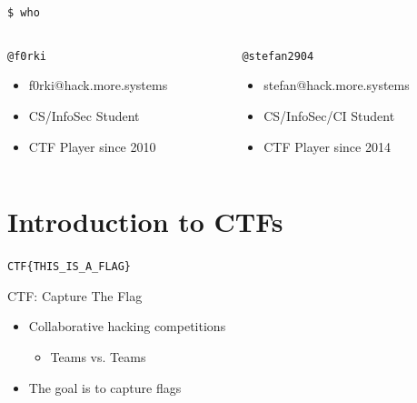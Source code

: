{
\begin{frame}[t,plain]
    \titlepage
\end{frame}
}

\begin{frame}
  {\texttt{\$ who}}

  \begin{columns}
    \begin{column}{0.48\textwidth}
      {\texttt{@f0rki}}
      \begin{itemize}
        \item f0rki@hack.more.systems
        \item CS/InfoSec Student
        \item CTF Player since 2010
      \end{itemize}
    \end{column}

    \begin{column}{0.48\textwidth}
      \texttt{@stefan2904}
      \begin{itemize}
        \item stefan@hack.more.systems
        \item CS/InfoSec/CI Student
        \item CTF Player since 2014
      \end{itemize}
    \end{column}
  \end{columns}

\end{frame}




\section{Introduction to CTFs}

\begin{frame}
	 \begin{center}
	 	\Huge\verb+CTF{THIS_IS_A_FLAG}+
	 \end{center}
\end{frame}

\begin{frame}[fragile]
  {CTF: Capture The Flag}

  \begin{itemize}
    \item Collaborative hacking competitions
    \begin{itemize}
    	\item Teams vs. Teams
    \end{itemize}
    \item The goal is to capture flags
  \end{itemize}
\end{frame}


